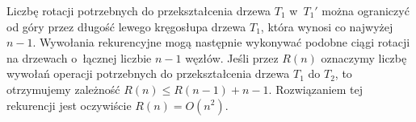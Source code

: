 Liczbę rotacji potrzebnych do przekształcenia drzewa $T_1$ w~$T_1'$ można ograniczyć od góry przez długość lewego kręgosłupa drzewa $T_1$, która wynosi co najwyżej $n-1$.
Wywołania rekurencyjne mogą następnie wykonywać podobne ciągi rotacji na drzewach o~łącznej liczbie $n-1$ węzłów.
Jeśli przez $R(n)$ oznaczymy liczbę wywołań operacji  potrzebnych do przekształcenia  drzewa $T_1$ do $T_2$, to otrzymujemy zależność $R(n)\le R(n-1)+n-1$.
Rozwiązaniem tej rekurencji jest oczywiście $R(n)=O(n^2)$.
